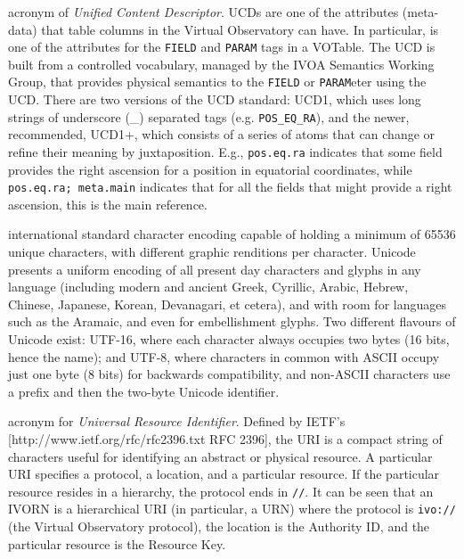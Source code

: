 {
    	acronym of \emph{Unified Content Descriptor}. UCDs are one of
        the attributes (meta-data) that table columns in the
        \gls{Virtual Observatory} can have. In particular, is one of
        the attributes for the \texttt{FIELD} and \texttt{PARAM} tags
        in a \gls{VOTable}. The UCD is built from a controlled
        vocabulary, managed by the \gls{IVOA Semantics Working Group},
        that provides physical semantics to the \texttt{FIELD} or
        \texttt{PARAM}eter using the UCD. There are two versions of the
        UCD standard: UCD1, which uses long strings of underscore (_)
        separated tags (e.g. \texttt{POS_EQ_RA}), and the newer,
        recommended, UCD1+, which consists of a series of atoms that
        can change or refine their meaning by juxtaposition. E.g.,
        \texttt{pos.eq.ra} indicates that some field provides the right
        ascension for a position in equatorial coordinates, while
        \texttt{pos.eq.ra; meta.main} indicates that for all the fields
        that might provide a right ascension, this is the main
        reference.
}

{
    	international standard character encoding capable of holding a
        minimum of 65536 unique characters, with different graphic
        renditions per character. Unicode presents a uniform encoding
        of all present day characters and glyphs in any language
        (including modern and ancient Greek, Cyrillic, Arabic, Hebrew,
        Chinese, Japanese, Korean, Devanagari, et cetera),
		and with room for
        languages such as the Aramaic, and even for embellishment
        glyphs. Two different flavours of Unicode exist: UTF-16, where
        each character always occupies two bytes (16 bits, hence the
        name); and UTF-8, where characters in common with \gls{ASCII}
        occupy just one byte (8 bits) for backwards compatibility, and
        non-ASCII characters use a prefix and then the two-byte Unicode
        identifier.
}

{
    	acronym for \emph{Universal Resource Identifier}. Defined by
        \gls{IETF}'s [http://www.ietf.org/rfc/rfc2396.txt RFC 2396],
        the URI is a compact string of characters useful for
        identifying an abstract or physical resource. A particular URI
        specifies a protocol, a location, and a particular resource. If
        the particular resource resides in a hierarchy, the protocol
        ends in \texttt{//}. It can be seen that an \gls{IVORN} is a
        hierarchical \gls{URI} (in particular, a \gls{URN}) where the
        protocol is \texttt{ivo://} (the Virtual Observatory protocol),
        the location is the Authority ID, and the particular resource
        is the Resource Key.
}

